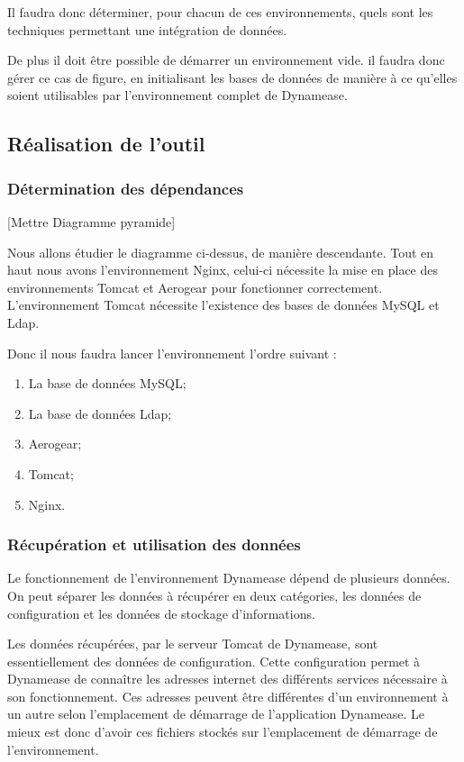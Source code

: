 Il faudra donc déterminer, pour chacun de ces environnements, quels sont les techniques permettant une intégration de données.

De plus il doit être possible de démarrer un environnement vide. il faudra donc gérer ce cas de figure, en initialisant les bases de données de manière à ce qu'elles soient utilisables par l'environnement complet de Dynamease.

\subsection{Réalisation de l'outil}

\subsubsection{Détermination des dépendances}

[Mettre Diagramme pyramide]

Nous allons étudier le diagramme ci-dessus, de manière descendante. Tout en haut nous avons l'environnement Nginx, celui-ci nécessite la mise en place des environnements Tomcat et Aerogear pour fonctionner correctement. L'environnement Tomcat nécessite l'existence des bases de données MySQL et Ldap. 

Donc il nous faudra lancer l'environnement l'ordre suivant :

\begin{enumerate}
	\item La base de données MySQL;
	\item La base de données Ldap;
	\item Aerogear;
	\item Tomcat;
	\item Nginx.
\end{enumerate}

\subsubsection{Récupération et utilisation des données}

Le fonctionnement de l'environnement Dynamease dépend de plusieurs données. On peut séparer les données à récupérer en deux catégories, les données de configuration et les données de stockage d'informations.

Les données récupérées, par le serveur Tomcat de Dynamease, sont essentiellement des données de configuration. Cette configuration permet à Dynamease de connaître les adresses internet des différents services nécessaire à son fonctionnement. Ces adresses peuvent être différentes d'un environnement à un autre selon l'emplacement de démarrage de l'application Dynamease. Le mieux est donc d'avoir ces fichiers stockés sur l'emplacement de démarrage de l'environnement.

